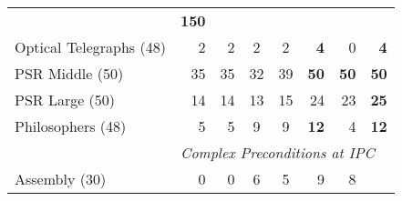 \begin{tabular}{lrrccrrr}
                                            & \textbf{150}                                                                                                                              \\
    {Optical Telegraphs} (48)        & 2                                        & 2
                                            & 2                                        & 2
                                            & \textbf{4}                               & 0
                                            & \textbf{4}                                                                                                                                \\
    {PSR Middle} (50)                & 35                                       & 35
                                            & 32                                       & 39
                                            & \textbf{50}                              & \textbf{50}
                                            & \textbf{50}                                                                                                                               \\
    {PSR Large} (50)                 & 14                                       & 14
                                            & 13                                       & 15
                                            & 24                                       & 23                                     &
    \textbf{25}                                                                                                                                                                         \\
    {Philosophers} (48)              & 5                                        & 5
                                            & 9                                        & 9
                                            & \textbf{12}                              & 4
                                            & \textbf{12}                                                                                                                               \\
    \midrule
    & \multicolumn{7}{l}{\emph{Complex Preconditions at IPC}} \\
    {Assembly} (30)                  & 0                                        & 0
                                            & 6                                        & 5
                                            & 9                                        & 8                                      &

\end{tabular}
